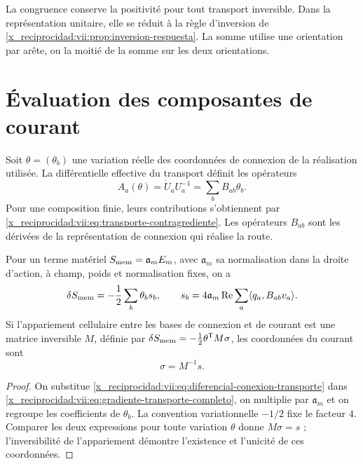 La congruence conserve la positivité pour tout transport inversible.
Dans la représentation unitaire, elle se réduit à la règle d'inversion de
\ref{x_reciprocidad:vii:prop:inversion-respuesta}. La somme utilise une orientation
par arête, ou la moitié de la somme sur les deux orientations.

\section{Évaluation des composantes de courant}

Soit \(\theta=(\theta_b)\) une variation réelle des coordonnées
de connexion de la réalisation utilisée. La différentielle effective du
transport définit les opérateurs
\begin{equation}
 A_a(\theta)=\dot U_aU_a^{-1}
     =\sum_bB_{ab}\theta_b.
 \label{x_reciprocidad:vii:eq:diferencial-conexion-transporte}
\end{equation}
Pour une composition finie, leurs contributions s'obtiennent par
\eqref{x_reciprocidad:vii:eq:transporte-contragrediente}. Les opérateurs
\(B_{ab}\) sont les dérivées de la représentation de connexion qui
réalise la route.

\begin{theorem}
\label{x_reciprocidad:vii:thm:corriente-conexion-evaluada}
Pour un terme matériel \(S_{\rm mem}=\mathfrak a_m E_m\), avec \(\mathfrak a_m\) sa normalisation dans la droite d'action, à champ, poids et normalisation fixes, on a
\begin{equation}
 \delta S_{\rm mem}=-\frac12\sum_b\theta_b s_b,\qquad
 s_b=4\mathfrak a_m\operatorname{Re}
        \sum_a\langle q_a,B_{ab}v_a\rangle.
 \label{x_reciprocidad:vii:eq:componentes-corriente-conexion}
\end{equation}
Si l'appariement cellulaire entre les bases de connexion et de courant
est une matrice inversible \(M\), définie par
\(\delta S_{\rm mem}=-\tfrac12\theta^{\mathsf T}M\sigma\),
les coordonnées du courant sont
\begin{equation}
 \sigma=M^{-1}s.
 \label{x_reciprocidad:vii:eq:coordenadas-corriente-material}
\end{equation}
\end{theorem}

\begin{proof}
On substitue \eqref{x_reciprocidad:vii:eq:diferencial-conexion-transporte} dans
\eqref{x_reciprocidad:vii:eq:gradiente-transporte-completo}, on multiplie par
\(\mathfrak a_m\) et on regroupe les coefficients de
\(\theta_b\). La convention variationnelle \(-1/2\) fixe le
facteur \(4\). Comparer les deux expressions pour toute variation
\(\theta\) donne \(M\sigma=s\) ; l'inversibilité de
l'appariement démontre l'existence et l'unicité de ces coordonnées.
\end{proof}

